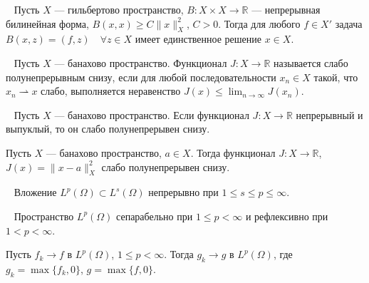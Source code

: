 \begin{theorem}
    \label{thm:lax-milgram}~\cite[с. 40]{Oben1977}
    Пусть $X$ — гильбертово пространство,
    $B : X \times X \to \mathbb{R}$ — непрерывная билинейная форма,
    $B(x, x) \geq C\|x\|^2_X$, $C > 0$.
    Тогда для любого $f \in X'$ задача
    $B(x, z) = (f, z) \quad \forall z \in X$
    имеет единственное решение $x \in X$.
\end{theorem}

\begin{definition}
    \label{def:weakly_semicontinuous}~\cite[с. 47]{Troeltzsch2010}
    Пусть $X$ — банахово пространство.
    Функционал $J : X \to \mathbb{R}$ называется слабо полунепрерывным
    снизу, если для любой последовательности $x_n \in X$ такой,
    что $x_n \rightharpoonup x$ слабо, выполняется неравенство
    $J(x) \leq \lim_{n \to \infty} J(x_n)$.
\end{definition}

\begin{lemma}
    \label{lem:weakly_semicontinuous_functional}~\cite[с. 47]{Troeltzsch2010}
    Пусть $X$ — банахово пространство.
    Если функционал $J : X \to \mathbb{R}$ непрерывный и выпуклый,
    то он слабо полунепрерывен снизу.
\end{lemma}

\begin{corollary}
    \label{cor:weakly_semicontinuous_norm}
    Пусть $X$ — банахово пространство, $a \in X$.
    Тогда функционал $J : X \to \mathbb{R}$, $J(x) = \|x - a\|^2_X$
    слабо полунепрерывен снизу.
\end{corollary}

\begin{lemma}
    \label{lem:embedding_Lp_Ls}~\cite[с. 37]{Zeidler1990a}
    Вложение $L^p(\Omega) \subset L^s(\Omega)$ непрерывно при
    $1 \leq s \leq p \leq \infty$.
\end{lemma}

\begin{lemma}
    \label{lem:Lp_separability_reflexivity}~\cite[с. 1020]{Zeidler1990b}
    Пространство $L^p(\Omega)$ сепарабельно при $1 \leq p < \infty$
    и рефлексивно при $1 < p < \infty$.
\end{lemma}

\begin{lemma}
    \label{lem:convergence_max_function}
    Пусть $f_k \to f$ в $L^p(\Omega)$, $1 \leq p < \infty$.
    Тогда $g_k \to g$ в $L^p(\Omega)$,
    где $g_k = \max\{f_k, 0\}$, $g = \max\{f, 0\}$.
\end{lemma}


